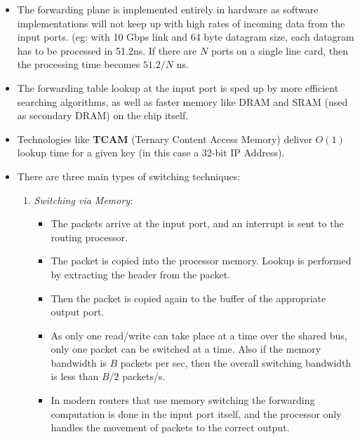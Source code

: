 \documentclass[a4paper]{article}
\theoremstyle{plain}
\theoremstyle{definition}
\begin{document}
\begin{itemize}
    \item The forwarding plane is implemented entirely in hardware as software implementations will not keep up with high rates of incoming data from the input ports. (eg: with 10 Gbps link and 64 byte datagram size, each datagram has to be processed in 51.2ns. If there are $N$ ports on a single line card, then the processing time becomes $51.2/N$ ns. 
    
    \item The forwarding table lookup at the input port is sped up by more efficient searching algorithms, as well as faster memory like DRAM and SRAM (used as secondary DRAM) on the chip itself. 
    
    \item Technologies like \textbf{TCAM} (Ternary Content Access Memory) deliver $O(1)$ lookup time for a given key (in this case a 32-bit IP Address). 
    
    \item There are three main types of switching techniques:
    
    \begin{enumerate}
        \item \textit{Switching via Memory}: 
        \begin{itemize}
            \item The packets arrive at the input port, and an interrupt is sent to the routing processor.
            
            \item The packet is copied into the processor memory. Lookup is performed by extracting the header from the packet. 
            
            \item Then the packet is copied again to the buffer of the appropriate output port. 
            
            \item As only one read/write can take place at a time over the shared bus, only one packet can be switched at a time. Also if the memory bandwidth is $B$ packets per sec, then the overall switching bandwidth is less than $B/2$ packets/s. 
            
            \item In modern routers that use memory switching the forwarding computation is done in the input port itself, and the processor only handles the movement of packets to the correct output. 
        \end{itemize}
        

\end{enumerate}
\end{itemize}
\end{document}
